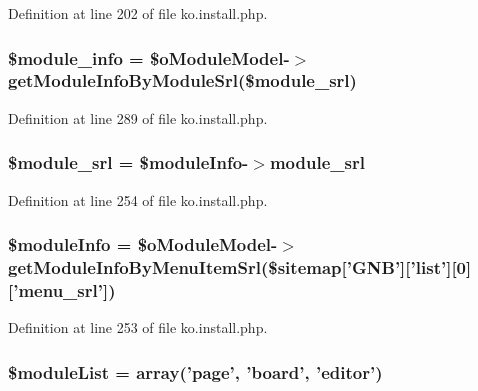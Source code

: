 Definition at line 202 of file ko.\-install.\-php.

\hypertarget{ko_8install_8php_a5e701819149f6ea0893d4b79010417d3}{
\subsubsection[{\$module\-\_\-info}]{\setlength{\rightskip}{0pt plus 5cm}\$module\-\_\-info = \$o\-Module\-Model-\/$>$get\-Module\-Info\-By\-Module\-Srl(\${\bf module\-\_\-srl})}}\label{ko_8install_8php_a5e701819149f6ea0893d4b79010417d3}


Definition at line 289 of file ko.\-install.\-php.

\hypertarget{ko_8install_8php_ae40aed4d7a99050245e66ca2a82949ed}{
\subsubsection[{\$module\-\_\-srl}]{\setlength{\rightskip}{0pt plus 5cm}\${\bf module\-\_\-srl} = \$module\-Info-\/$>${\bf module\-\_\-srl}}}\label{ko_8install_8php_ae40aed4d7a99050245e66ca2a82949ed}


Definition at line 254 of file ko.\-install.\-php.

\hypertarget{ko_8install_8php_ae3552a6dd49f37a50e7858151f7c5cc2}{
\subsubsection[{\$module\-Info}]{\setlength{\rightskip}{0pt plus 5cm}\$module\-Info = \$o\-Module\-Model-\/$>$get\-Module\-Info\-By\-Menu\-Item\-Srl(\$sitemap\mbox{[}'{\bf G\-N\-B}'\mbox{]}\mbox{[}'list'\mbox{]}\mbox{[}0\mbox{]}\mbox{[}'menu\-\_\-srl'\mbox{]})}}\label{ko_8install_8php_ae3552a6dd49f37a50e7858151f7c5cc2}


Definition at line 253 of file ko.\-install.\-php.

\hypertarget{ko_8install_8php_aaa80946d50e2d3677fbbc6d6c8a643c3}{
\subsubsection[{\$module\-List}]{\setlength{\rightskip}{0pt plus 5cm}\$module\-List = array('{\bf page}', '{\bf board}', '{\bf editor}')}}\label{ko_8install_8php_aaa80946d50e2d3677fbbc6d6c8a643c3}


